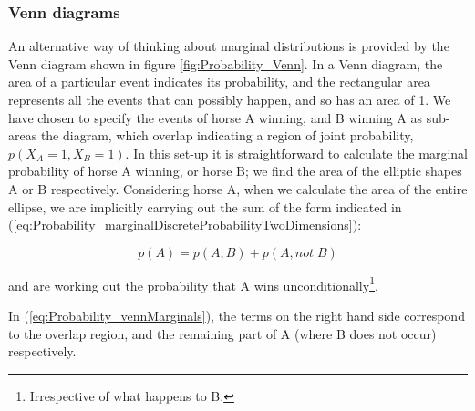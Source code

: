 \documentclass[11pt,fullpage]{book}
\begin{document}
\subsubsection{Venn diagrams}
An alternative way of thinking about marginal distributions is provided by the Venn diagram shown in figure \ref{fig:Probability_Venn}. In a Venn diagram, the area of a particular event indicates its probability, and the rectangular area represents all the events that can possibly happen, and so has an area of 1. We have chosen to specify the events of horse A winning, and B winning A as sub-areas the diagram, which overlap indicating a region of joint probability, $p(X_A=1,X_B=1)$. In this set-up it is straightforward to calculate the marginal probability of horse A winning, or horse B; we find the area of the elliptic shapes A or B respectively. Considering horse A, when we calculate the area of the entire ellipse, we are implicitly carrying out the sum of the form indicated in (\ref{eq:Probability_marginalDiscreteProbabilityTwoDimensions}):

\begin{equation}\label{eq:Probability_vennMarginals}
p(A) = p(A,B) + p(A,not\; B)
\end{equation}

and are working out the probability that A wins unconditionally\footnote{Irrespective of what happens to B.}.

In (\ref{eq:Probability_vennMarginals}), the terms on the right hand side correspond to the overlap region, and the remaining part of A (where B does not occur) respectively.
\end{document}
